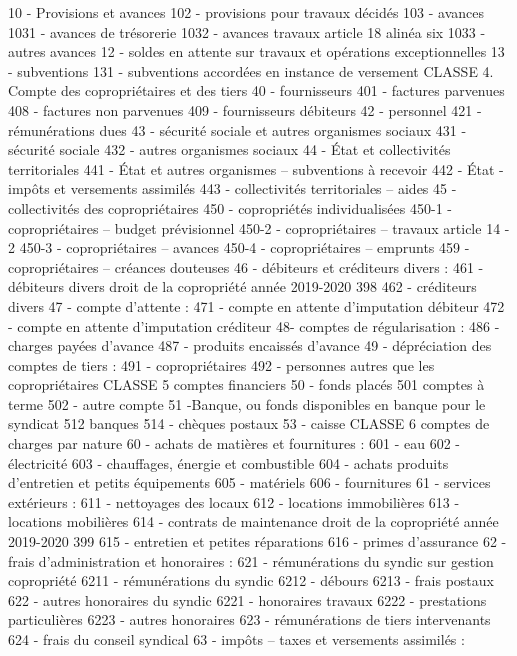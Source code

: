 10 - Provisions et avances
102 - provisions pour travaux décidés 103 - avances 1031 - avances de trésorerie
1032 - avances travaux article 18 alinéa six
1033 - autres avances
12 - soldes en attente sur travaux et opérations exceptionnelles
13 - subventions
131 - subventions accordées en instance de versement
CLASSE 4. Compte des copropriétaires et des tiers
40 - fournisseurs 401 - factures parvenues
408 - factures non parvenues 409 - fournisseurs débiteurs
42 - personnel
421 - rémunérations dues
43 - sécurité sociale et autres organismes sociaux
431 - sécurité sociale
432 - autres organismes sociaux
44 - État et collectivités territoriales
441 - État et autres organismes -- subventions à recevoir 442 - État -impôts et versements assimilés
443 - collectivités territoriales -- aides
45 - collectivités des copropriétaires
450 - copropriétés individualisées 450-1 - copropriétaires -- budget prévisionnel
450-2 - copropriétaires -- travaux article 14 - 2
450-3 - copropriétaires -- avances
450-4 - copropriétaires -- emprunts
459 - copropriétaires -- créances douteuses
46 - débiteurs et créditeurs divers :
461 - débiteurs divers
droit de la copropriété année 2019-2020
398
462 - créditeurs divers
47 - compte d'attente :
471 - compte en attente d'imputation débiteur
472 - compte en attente d'imputation créditeur
48- comptes de régularisation :
486 - charges payées d'avance
487 - produits encaissés d'avance
49 - dépréciation des comptes de tiers :
491 - copropriétaires
492 - personnes autres que les copropriétaires
CLASSE 5 comptes financiers
50 - fonds placés
501 comptes à terme
502 - autre compte
51 -Banque, ou fonds disponibles en banque pour le syndicat
512 banques
514 - chèques postaux
53 - caisse
CLASSE 6 comptes de charges par nature
60 - achats de matières et fournitures :
601 - eau
602 - électricité
603 - chauffages, énergie et combustible
604 - achats produits d'entretien et petits équipements
605 - matériels
606 - fournitures
61 - services extérieurs :
611 - nettoyages des locaux
612 - locations immobilières
613 - locations mobilières
614 - contrats de maintenance
droit de la copropriété année 2019-2020
399
615 - entretien et petites réparations
616 - primes d'assurance
62 - frais d'administration et honoraires :
621 - rémunérations du syndic sur gestion copropriété
6211 - rémunérations du syndic
6212 - débours
6213 - frais postaux
622 - autres honoraires du syndic
6221 - honoraires travaux
6222 - prestations particulières
6223 - autres honoraires
623 - rémunérations de tiers intervenants
624 - frais du conseil syndical
63 - impôts -- taxes et versements assimilés :
